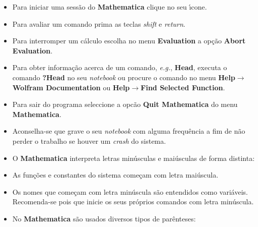 \documentclass[11pt]{article}
\begin{document}
\begin{itemize}


\item Para iniciar uma sess\~ao do \textbf{Mathematica} clique no seu \'\i cone. 



\item Para avaliar um comando prima as  teclas \textsl{shift} e \textsl{return}.  



\item Para interromper um c\'alculo escolha no menu \textbf{Evaluation} a op\c{c}\~ao \textbf{Abort Evaluation}. 



\item Para obter informa\c{c}\~ao acerca de um comando, \textsl{e.g.}, \textbf{Head}, executa o comando \textbf{?Head} no seu \textsl{notebook} ou procure o comando no menu \textbf{Help}$\rightarrow$\textbf{Wolfram Documentation} ou  \textbf{Help}$\rightarrow$\textbf{Find Selected Function}.





\item Para sair do  programa  seleccione a opc\~ao \textbf{Quit Mathematica} do menu \textbf{Mathematica}. 




\item Aconselha-se que grave o seu \textsl{notebook}  com alguma frequ\^encia a fim de n\~ao perder o trabalho se houver um \textsl{crash} do sistema.




\item O \textbf{Mathematica} interpreta letras min\'usculas e mai\'usculas de forma distinta: 

 




\item As fun\c{c}\~oes e constantes do sistema come\c{c}am com letra mai\'uscula.  
 


\item Os nomes que come\c{c}am com letra min\'uscula s\~ao entendidos como vari\'aveis. Recomenda-se pois que inicie os seus pr\'oprios comandos com letra min\'uscula. 



\item No \textbf{Mathematica} s\~ao usados diversos tipos de par\^enteses: 






\end{itemize}
\end{document}
